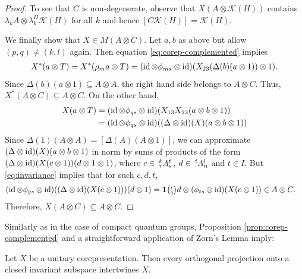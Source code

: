 \begin{proof}
To see that $C$ is non-degenerate, observe that $X(A\otimes
\mathcal{K}(H))$ contains $\lambda_{k}A \otimes
\lambda_{k}^{H}\mathcal{K}(H)$ for all $k$ and hence
$[C\mathcal{K}(H)]=\mathcal{K}(H)$.

We finally show that $X \in M(A\otimes C)$.  Let $a,b$ as above but
allow $(p,q)\neq (k,l)$ again. 
Then
equation \eqref{eq:corep-complemented}  implies 
\begin{align*}
  X^{*}(a\otimes T) = X^{*}(\rho_{m}a\otimes T) = (\operatorname{id} \otimes \phi_{ms}
  \otimes \operatorname{id})(X_{23}(\Delta(b)(a\otimes 1))\otimes 1).
\end{align*}
Since $\Delta(b)(a\otimes 1) \subseteq A\otimes A$, the right hand
side belongs to $A\otimes C$. Thus, $X^{*}(A\otimes C) \subseteq
A\otimes C$. On the other hand, 
\begin{align*}
  X(a\otimes T) &= (\operatorname{id} \otimes \phi_{qs} \otimes
  \operatorname{id})(X_{13}X_{23}(a\otimes b\otimes 1)) \\ &= (\operatorname{id} \otimes \phi_{qs}
  \otimes \operatorname{id})((\Delta \otimes \operatorname{id})(X)(a\otimes b\otimes 1)) 
\end{align*}
Since $\Delta(1)(A \otimes A) = [\Delta(A)(A \otimes 1)]$, we can
approximate $(\Delta \otimes \operatorname{id})(X)(a\otimes b\otimes 1)$ in norm by sums of
products of the form $(\Delta \otimes\operatorname{id})(X(c\otimes 1))(d \otimes
1\otimes 1)$, where %
$c\in \Gr{A}{k}{t}{r}{s}$, $d \in
\Gr{A}{t}{l}{}{n}$ and $t\in I$. But \eqref{eq:invariance} implies that for such $c,d,t$,
\begin{align*}
(\id \otimes \phi_{qs} 
  \otimes \id)(  (\Delta \otimes\id)(X(c\otimes 1)))(d \otimes %
1) &= \UnitC{t}{q}d \otimes (\phi_{ts} \otimes \id)(X(c\otimes 1)) \in A
\otimes C.
\end{align*}
Therefore, $X(A \otimes C) \subseteq A\otimes C$.
  \end{proof}

Similarly as in the case of compact quantum groups, Proposition \ref{prop:corep-complemented}
and a straightforward application of Zorn's Lemma imply:
\begin{Cor} \label{cor:invariant-complemented}
  Let $X$ be a unitary corepresentation. Then every orthogonal projection onto a closed invariant
  subspace intertwines $X$.
\end{Cor}


